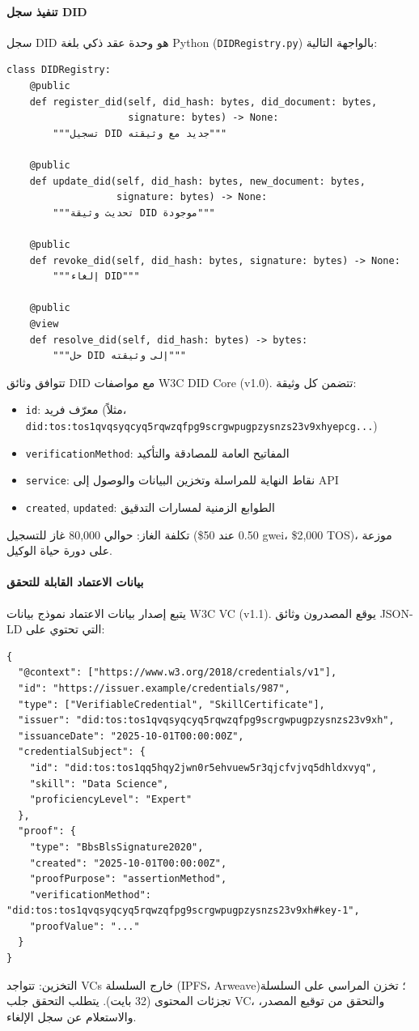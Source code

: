 \documentclass[11pt]{article}
\begin{document}
\paragraph{تنفيذ سجل DID} سجل DID هو وحدة عقد ذكي بلغة Python (\texttt{DIDRegistry.py}) بالواجهة التالية:
\begin{verbatim}
class DIDRegistry:
    @public
    def register_did(self, did_hash: bytes, did_document: bytes,
                     signature: bytes) -> None:
        """تسجيل DID جديد مع وثيقته"""

    @public
    def update_did(self, did_hash: bytes, new_document: bytes,
                   signature: bytes) -> None:
        """تحديث وثيقة DID موجودة"""

    @public
    def revoke_did(self, did_hash: bytes, signature: bytes) -> None:
        """إلغاء DID"""

    @public
    @view
    def resolve_did(self, did_hash: bytes) -> bytes:
        """حل DID إلى وثيقته"""
\end{verbatim}
تتوافق وثائق DID مع مواصفات W3C DID Core (v1.0). تتضمن كل وثيقة:
\begin{itemize}[noitemsep]
  \item \texttt{id}: معرّف فريد (مثلاً، \texttt{did:tos:tos1qvqsyqcyq5rqwzqfpg9scrgwpugpzysnzs23v9xhyepcg...})
  \item \texttt{verificationMethod}: المفاتيح العامة للمصادقة والتأكيد
  \item \texttt{service}: نقاط النهاية للمراسلة وتخزين البيانات والوصول إلى API
  \item \texttt{created}, \texttt{updated}: الطوابع الزمنية لمسارات التدقيق
\end{itemize}
تكلفة الغاز: حوالي 80,000 غاز للتسجيل (\$0.50 عند 50 gwei، \$2,000 TOS)، موزعة على دورة حياة الوكيل.

\paragraph{بيانات الاعتماد القابلة للتحقق} يتبع إصدار بيانات الاعتماد نموذج بيانات W3C VC (v1.1). يوقع المصدرون وثائق JSON-LD التي تحتوي على:
\begin{verbatim}
{
  "@context": ["https://www.w3.org/2018/credentials/v1"],
  "id": "https://issuer.example/credentials/987",
  "type": ["VerifiableCredential", "SkillCertificate"],
  "issuer": "did:tos:tos1qvqsyqcyq5rqwzqfpg9scrgwpugpzysnzs23v9xh",
  "issuanceDate": "2025-10-01T00:00:00Z",
  "credentialSubject": {
    "id": "did:tos:tos1qq5hqy2jwn0r5ehvuew5r3qjcfvjvq5dhldxvyq",
    "skill": "Data Science",
    "proficiencyLevel": "Expert"
  },
  "proof": {
    "type": "BbsBlsSignature2020",
    "created": "2025-10-01T00:00:00Z",
    "proofPurpose": "assertionMethod",
    "verificationMethod": "did:tos:tos1qvqsyqcyq5rqwzqfpg9scrgwpugpzysnzs23v9xh#key-1",
    "proofValue": "..."
  }
}
\end{verbatim}
التخزين: تتواجد VCs خارج السلسلة (IPFS، Arweave)؛ تخزن المراسي على السلسلة تجزئات المحتوى (32 بايت). يتطلب التحقق جلب VC، والتحقق من توقيع المصدر، والاستعلام عن سجل الإلغاء.
\end{document}
